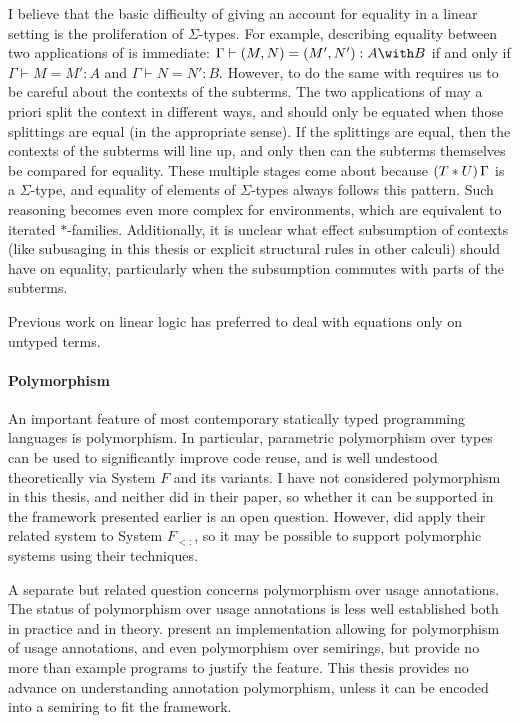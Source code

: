 I believe that the basic difficulty of giving an account for equality in a
linear setting is the proliferation of $\Sigma$-types.
For example, describing equality between two applications of
 is immediate: $\Gamma \vdash (M, N) = (M', N') : A \with B$
if and only if $\Gamma \vdash M = M' : A$ and $\Gamma \vdash N = N' : B$.
However, to do the same with  requires us to be careful
about the contexts of the subterms.
The two applications of  may a priori split the context in
different ways, and should only be equated when those splittings are equal
(in the appropriate sense).
If the splittings are equal, then the contexts of the subterms will line up, and
only then can the subterms themselves be compared for equality.
These multiple stages come about because $\plr{T * U}\,\Gamma$ is a
$\Sigma$-type, and equality of elements of $\Sigma$-types always follows this
pattern.
Such reasoning becomes even more complex for environments, which are equivalent
to iterated $*$-families.
Additionally, it is unclear what effect subsumption of contexts (like subusaging
in this thesis or explicit structural rules in other calculi) should have on
equality, particularly when the subsumption commutes with parts of the subterms.

Previous work on linear logic has preferred to deal with equations only on
untyped terms. 

\paragraph{Polymorphism}
An important feature of most contemporary statically typed programming languages
is polymorphism.
In particular, parametric polymorphism over types can be used to significantly
improve code reuse, and is well undestood theoretically via System $F$ and its
variants.
I have not considered polymorphism in this thesis, and neither did
\citet{AACMM21} in their paper, so whether it can be supported in the framework
presented earlier is an open question.
However, \citet{Autosubst15} did apply their related system to System $F_{<:}$,
so it may be possible to support polymorphic systems using their techniques.

A separate but related question concerns polymorphism over usage annotations.
The status of polymorphism over usage annotations is less well established both
in practice and in theory.
 present an implementation allowing for polymorphism of usage
annotations, and even polymorphism over semirings, but provide no more than
example programs to justify the feature.
This thesis provides no advance on understanding annotation polymorphism, unless
it can be encoded into a semiring to fit the framework.

